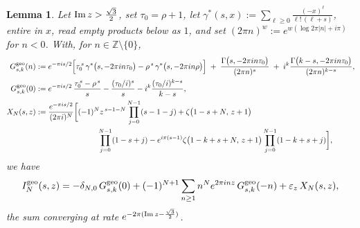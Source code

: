 \documentclass[11pt]{article}
\newtheorem{lemma}[theorem]{Lemma}
\newcommand{\ZZ}{\mathbb{Z}}
\begin{document}
\begin{lemma}\label{lem:geopolylog}
Let ${\rm Im}\,z>\tfrac{\sqrt3}{2}$, set $\tau_0=\rho+1$, let
$\gamma^*(s,x):=\sum_{\ell\ge0}\frac{(-x)^{\ell}}{\ell!\,(\ell+s)}$, entire in $x$, read empty
products below as $1$, and set $(2\pi n)^{w}:=e^{w(\log 2\pi|n|+i\pi)}$ for $n<0$. With, for
$n\in\ZZ\setminus\{0\}$,
\begin{align}\label{eq:geoG}
G^{\rm geo}_{s,k}(n)&:=e^{-\pi is/2}\Big[\tau_0^{\,s}\,\gamma^*\big(s,-2\pi in\tau_0\big)
-\rho^{\,s}\,\gamma^*\big(s,-2\pi in\rho\big)\Big]
\;+\;\frac{\Gamma\big(s,-2\pi in\tau_0\big)}{(2\pi n)^{s}}
\;+\;i^{k}\frac{\Gamma\big(k-s,-2\pi in\tau_0\big)}{(2\pi n)^{k-s}},\\
\label{eq:geoG0}
G^{\rm geo}_{s,k}(0)&:=e^{-\pi is/2}\,\frac{\tau_0^{\,s}-\rho^{\,s}}{s}
-\frac{(\tau_0/i)^{s}}{s}-i^{k}\frac{(\tau_0/i)^{k-s}}{k-s},
\\
\label{eq:geocross}
X_N(s,z)&:=\frac{e^{-\pi is/2}}{(2\pi i)^{N}}\bigg[(-1)^{N}z^{\,s-1-N}\prod_{j=0}^{N-1}(s-1-j)
+\zeta\big(1-s+N,\,z+1\big)
\\\nonumber&\qquad\qquad\qquad\qquad
\prod_{j=0}^{N-1}(1-s+j)
-e^{i\pi(s-1)}\zeta\big(1-k+s+N,\,z+1\big)\prod_{j=0}^{N-1}(1-k+s+j)\bigg],
\end{align}
we have
\begin{equation}\label{eq:geoIN}
I^{\rm geo}_N(s,z)=-\delta_{N,0}\,G^{\rm geo}_{s,k}(0)
+(-1)^{N+1}\sum_{n\ge1}n^{N}e^{2\pi inz}\,G^{\rm geo}_{s,k}(-n)
+\varepsilon_z\,X_N(s,z),
\end{equation}
the sum converging at rate $e^{-2\pi({\rm Im}\,z-\frac{\sqrt3}{2})}$.
\end{lemma}
\end{document}
